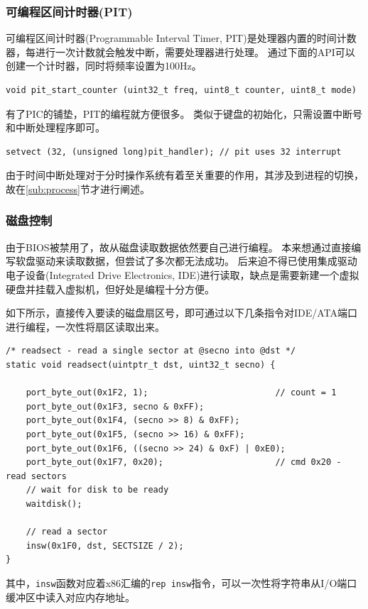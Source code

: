 \documentclass[logo,reportComp]{thesis}
\begin{document}
\subsubsection{可编程区间计时器(PIT)}
可编程区间计时器(Programmable Interval Timer, PIT)是处理器内置的时间计数器，每进行一次计数就会触发中断，需要处理器进行处理。
通过下面的API可以创建一个计时器，同时将频率设置为100Hz。
\begin{lstlisting}
void pit_start_counter (uint32_t freq, uint8_t counter, uint8_t mode)
\end{lstlisting}

有了PIC的铺垫，PIT的编程就方便很多。
类似于键盘的初始化，只需设置中断号和中断处理程序即可。
\begin{lstlisting}
setvect (32, (unsigned long)pit_handler); // pit uses 32 interrupt
\end{lstlisting}

由于时间中断处理对于分时操作系统有着至关重要的作用，其涉及到进程的切换，故在\ref{sub:process}节才进行阐述。

\subsubsection{磁盘控制}
由于BIOS被禁用了，故从磁盘读取数据依然要自己进行编程。
本来想通过直接编写软盘驱动来读取数据，但尝试了多次都无法成功。
后来迫不得已使用集成驱动电子设备(Integrated Drive Electronics, IDE)进行读取，缺点是需要新建一个虚拟硬盘并挂载入虚拟机，但好处是编程十分方便。

如下所示，直接传入要读的磁盘扇区号，即可通过以下几条指令对IDE/ATA端口进行编程，一次性将扇区读取出来。
\begin{lstlisting}
/* readsect - read a single sector at @secno into @dst */
static void readsect(uintptr_t dst, uint32_t secno) {

    port_byte_out(0x1F2, 1);                         // count = 1
    port_byte_out(0x1F3, secno & 0xFF);
    port_byte_out(0x1F4, (secno >> 8) & 0xFF);
    port_byte_out(0x1F5, (secno >> 16) & 0xFF);
    port_byte_out(0x1F6, ((secno >> 24) & 0xF) | 0xE0);
    port_byte_out(0x1F7, 0x20);                      // cmd 0x20 - read sectors
    // wait for disk to be ready
    waitdisk();

    // read a sector
    insw(0x1F0, dst, SECTSIZE / 2);
}
\end{lstlisting}

其中，\verb'insw'函数对应着x86汇编的\verb'rep insw'指令，可以一次性将字符串从I/O端口缓冲区中读入对应内存地址。
\end{document}
